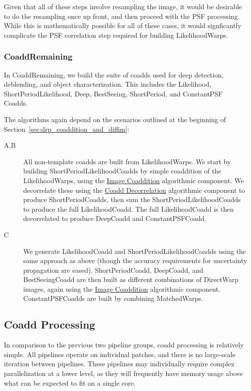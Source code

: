 Given that all of these steps involve resampling the image, it would be desirable to do the resampling once up front, and then proceed with the PSF processing.  While this is mathematically possible for all of these cases, it would signficantly complicate the PSF correlation step required for building LikelihoodWarps.

\subsubsection{CoaddRemaining}
\label{sec:drpCoaddRemaining}

In CoaddRemaining, we build the suite of coadds used for deep detection, deblending, and object characterization.  This includes the Likelihood, ShortPeriodLikelihood, Deep, BestSeeing, ShortPeriod, and ConstantPSF Coadds.

The algorithms again depend on the scenarios outlined at the beginning of Section~\ref{sec:drp_coaddition_and_diffim}:
\begin{description}
\item[A,B] All non-template coadds are built from LikelihoodWarps.  We start by building ShortPeriodLikelihoodCoadds by simple coaddition of the LikelihoodWarps, using the \hyperref[sec:acCoaddition]{Image Coaddition} algorithmic component.  We decorrelate these using the \hyperref[sec:acCoaddDecorrelation]{Coadd Decorrelation} algorithmic component to produce ShortPeriodCoadds, then sum the ShortPeriodLikelihoodCoadds to produce the full LikelihoodCoadd.  The full LikelihoodCoadd is then decorrelated to produce DeepCoadd and ConstantPSFCoadd.
\item[C] We generate LikelihoodCoadd and ShortPeriodLikelihoodCoadds using the same approach as above (though the accuracy requirements for uncertainty propagation are eased). ShortPeriodCoadd, DeepCoadd, and BestSeeingCoadd are then built as different combinations of DirectWarp images, again using the \hyperref[sec:acCoaddition]{Image Coaddition} algorithmic component.  ConstantPSFCoadds are built by combining MatchedWarps.
\end{description}

\subsection{Coadd Processing}
\label{sec:drp_coadd_processing}

In comparison to the previous two pipeline groups, coadd processing is relatively simple.  All pipelines operate on individual patches, and there is no large-scale iteration between pipelines.  These pipelines may individually require complex parallelization at a lower level, as they will frequently have memory usage above what can be expected to fit on a single core.

